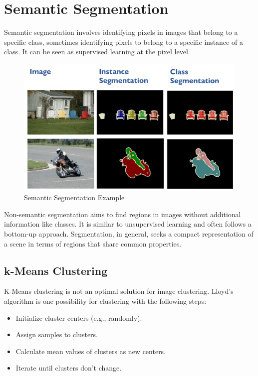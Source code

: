 \section{Semantic Segmentation}


Semantic segmentation involves identifying pixels in images that belong to a specific class,
sometimes identifying pixels to belong to a specific instance of a class. It can be seen as supervised learning at the pixel level.

\begin{figure}[h]
	\centering
	\includegraphics[width=0.7\linewidth]{img/semantic_segmentation}
	\caption{Semantic Segmentation Example}
\end{figure}

Non-semantic segmentation aims to find regions in images without additional information like classes.
It is similar to unsupervised learning and often follows a bottom-up approach.
Segmentation, in general, seeks a compact representation of a scene in terms of regions that share common properties.

\subsection{k-Means Clustering}

K-Means clustering is not an optimal solution for image clustering. Lloyd's algorithm is one possibility for clustering with the following steps:

\begin{itemize}
	\item Initialize cluster centers (e.g., randomly).
	\item Assign samples to clusters.
	\item Calculate mean values of clusters as new centers.
	\item Iterate until clusters don't change.
\end{itemize}


